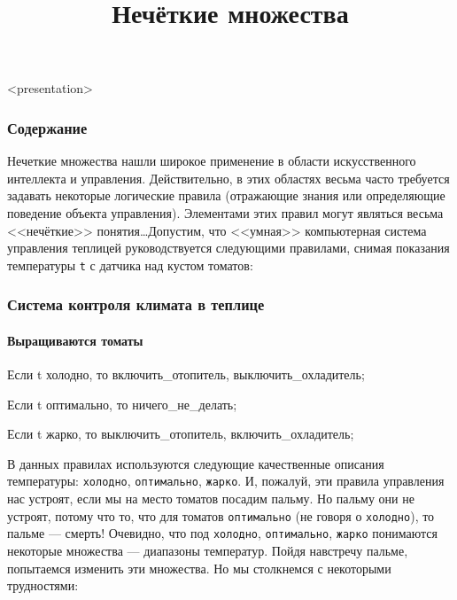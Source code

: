 


\title{Нечёткие множества}





\begin{frame}<presentation>
    \frametitle{Содержание}
    \tableofcontents
\end{frame}

Нечеткие множества нашли широкое применение в области искусственного интеллекта и управления. Действительно, в этих областях весьма часто требуется задавать некоторые логические правила (отражающие знания или определяющие поведение объекта управления). Элементами этих правил могут являться весьма <<нечёткие>> понятия\ldots Допустим, что <<умная>> компьютерная система управления теплицей руководствуется следующими правилами, снимая показания температуры \verb"t" с датчика над кустом томатов:

\begin{frame}[fragile]
    \frametitle{Система контроля климата в теплице}
    \framesubtitle{Выращиваются томаты}
    
\begin{semiverbatim}
\alert{Если} t холодно,    \alert{то}
        включить_отопитель,
        выключить_охладитель;
    
\alert{Если} t оптимально, \alert{то}
        ничего_не_делать;
    
\alert{Если} t жарко,      \alert{то}
        выключить_отопитель,
        включить_охладитель;
\end{semiverbatim}
\end{frame}

В данных правилах используются следующие качественные описания температуры: \verb"холодно", \verb"оптимально", \verb"жарко". И, пожалуй, эти правила управления нас устроят, если мы на место томатов посадим пальму. Но пальму они не устроят, потому что то, что для томатов \verb"оптимально" (не говоря о \verb"холодно"), то пальме --- смерть! Очевидно, что под \verb"холодно", \verb"оптимально", \verb"жарко" понимаются некоторые множества --- диапазоны температур. Пойдя навстречу пальме, попытаемся изменить эти множества. Но мы столкнемся с некоторыми трудностями: 

